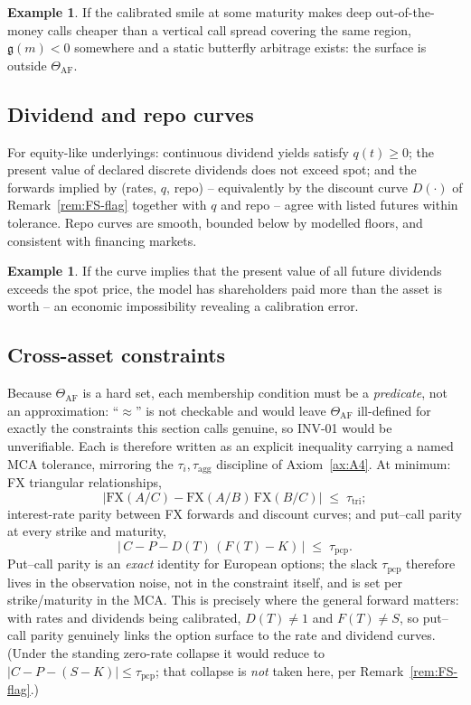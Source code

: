 \documentclass[11pt]{book}
\theoremstyle{plain}
\theoremstyle{definition}
\newtheorem{example}[theorem]{Example}
\theoremstyle{remark}
\newcommand{\mln}{m}                             %
\newcommand{\gDurr}{\mathfrak{g}}                %
\begin{document}
\begin{example}
If the calibrated smile at some maturity makes deep out-of-the-money calls
cheaper than a vertical call spread covering the same region, $\gDurr(\mln)<0$
somewhere and a static butterfly arbitrage exists: the surface is outside
$\Theta_{\mathrm{AF}}$.
\end{example}

\subsection{Dividend and repo curves}

For equity-like underlyings: continuous dividend yields satisfy $q(t)\ge0$; the
present value of declared discrete dividends does not exceed spot; and the
forwards implied by (rates, $q$, repo) -- equivalently by the discount curve
$D(\cdot)$ of Remark~\ref{rem:FS-flag} together with $q$ and repo -- agree with
listed futures within tolerance. Repo curves are smooth, bounded below by modelled floors, and
consistent with financing markets.

\begin{example}
If the curve implies that the present value of all future dividends exceeds the
spot price, the model has shareholders paid more than the asset is worth -- an
economic impossibility revealing a calibration error.
\end{example}

\subsection{Cross-asset constraints}

Because $\Theta_{\mathrm{AF}}$ is a hard set, each membership condition must be a
\emph{predicate}, not an approximation: ``$\approx$'' is not checkable and would
leave $\Theta_{\mathrm{AF}}$ ill-defined for exactly the constraints this section
calls genuine, so INV-01 would be unverifiable. Each is therefore written as an
explicit inequality carrying a named MCA tolerance, mirroring the
$\tau_i,\tau_{\mathrm{agg}}$ discipline of Axiom~\ref{ax:A4}. At minimum: FX
triangular relationships,
\[
    \bigl|\mathrm{FX}(A/C)-\mathrm{FX}(A/B)\,\mathrm{FX}(B/C)\bigr|
    \;\le\;\tau_{\mathrm{tri}} ;
\]
interest-rate parity between FX forwards and discount curves; and put--call parity
at every strike and maturity,
\[
    \bigl|\,C - P - D(T)\,(F(T)-K)\,\bigr| \;\le\;\tau_{\mathrm{pcp}} .
\]
Put--call parity is an \emph{exact} identity for European options; the slack
$\tau_{\mathrm{pcp}}$ therefore lives in the observation noise, not in the
constraint itself, and is set per strike/maturity in the MCA. This is precisely
where the general forward matters: with rates and dividends being calibrated,
$D(T)\ne1$ and $F(T)\ne S$, so put--call parity genuinely links the option surface
to the rate and dividend curves. (Under the standing zero-rate collapse it would
reduce to $|C-P-(S-K)|\le\tau_{\mathrm{pcp}}$; that collapse is \emph{not} taken
here, per Remark~\ref{rem:FS-flag}.)
\end{document}
